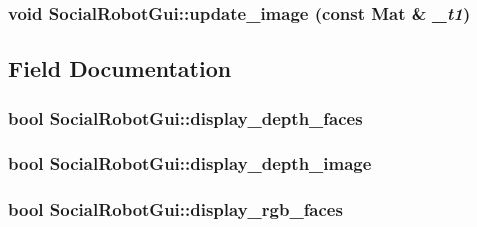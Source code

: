 \label{classSocialRobotGui_a3333bd4377889eb97216ebfbb10f8104}
\hypertarget{classSocialRobotGui_aba07bb0bb3b8fa3f317539e9d6698aee}{
\subsubsection[{update\_\-image}]{\setlength{\rightskip}{0pt plus 5cm}void SocialRobotGui::update\_\-image (const Mat \& {\em \_\-t1})}}
\label{classSocialRobotGui_aba07bb0bb3b8fa3f317539e9d6698aee}


\subsection{Field Documentation}
\hypertarget{classSocialRobotGui_a1d32e49a34a1a0eafe6a7e160307bf82}{
\subsubsection[{display\_\-depth\_\-faces}]{\setlength{\rightskip}{0pt plus 5cm}bool {\bf SocialRobotGui::display\_\-depth\_\-faces}}}
\label{classSocialRobotGui_a1d32e49a34a1a0eafe6a7e160307bf82}
\hypertarget{classSocialRobotGui_aec418c0fe6ac3e995e2fedda35d0237e}{
\subsubsection[{display\_\-depth\_\-image}]{\setlength{\rightskip}{0pt plus 5cm}bool {\bf SocialRobotGui::display\_\-depth\_\-image}}}
\label{classSocialRobotGui_aec418c0fe6ac3e995e2fedda35d0237e}
\hypertarget{classSocialRobotGui_a57c8e1f9be7edfe29703853268aa8aba}{
\subsubsection[{display\_\-rgb\_\-faces}]{\setlength{\rightskip}{0pt plus 5cm}bool {\bf SocialRobotGui::display\_\-rgb\_\-faces}}}
